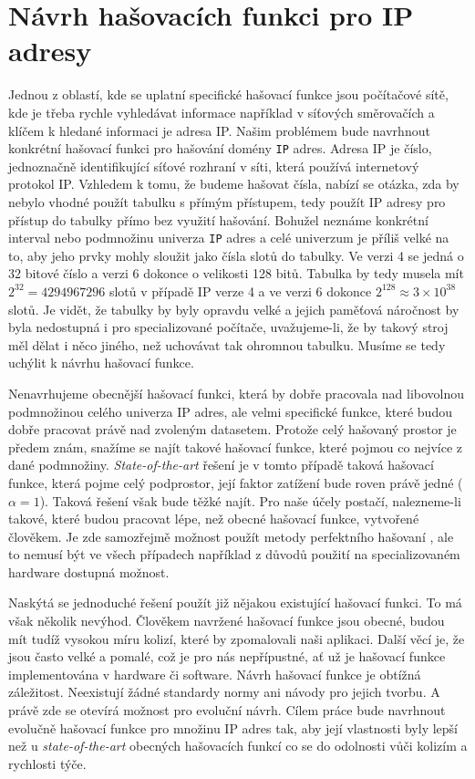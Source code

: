 \section{Návrh hašovacích funkci pro IP adresy}
Jednou z oblastí, kde se uplatní specifické hašovací funkce jsou počítačové sítě,
kde je třeba rychle vyhledávat informace například v síťových směrovačích a
klíčem k hledané informaci je adresa IP.
Našim problémem bude navrhnout konkrétní hašovací funkci pro hašování domény
\texttt{IP} adres. Adresa IP je číslo, jednoznačně identifikující síťové
rozhraní v síti, která používá internetový protokol IP. Vzhledem k tomu,
že budeme hašovat čísla, nabízí se otázka, zda by nebylo vhodné použít tabulku
s přímým přístupem, tedy použít IP adresy pro přístup do tabulky
přímo bez využití hašování. Bohužel neznáme konkrétní interval nebo podmnožinu
univerza \texttt{IP} adres a celé univerzum je příliš velké na to, aby jeho 
prvky mohly sloužit jako čísla slotů do tabulky. Ve verzi 4 se jedná o 32 
bitové číslo a verzi 6 dokonce o velikosti 128 bitů. Tabulka by tedy musela
mít $2^{32} = 4 294 967 296$ slotů v případě IP verze 4 a ve verzi 6
dokonce $2^{128} \approx 3 \times 10^{38}$
slotů. Je vidět, že tabulky by byly opravdu velké a jejich paměťová náročnost
by byla nedostupná i pro specializované počítače, uvažujeme-li, že by takový
stroj měl dělat i něco jiného, než uchovávat tak ohromnou tabulku. Musíme se
tedy uchýlit k návrhu hašovací funkce.

Nenavrhujeme obecnější hašovací funkci, která by dobře
pracovala nad libovolnou podmnožinou celého univerza IP adres, ale velmi
specifické funkce, které budou dobře pracovat právě nad zvoleným datasetem.
Protože celý hašovaný prostor je předem znám, snažíme se najít takové hašovací
funkce, které pojmou co nejvíce z dané podmnožiny. \textit{State-of-the-art} řešení je v
tomto případě taková hašovací funkce, která pojme celý podprostor, její 
faktor zatížení bude roven právě jedné ($\alpha = 1$). Taková řešení však
bude těžké najít. Pro naše účely postačí, nalezneme-li takové, které budou
pracovat lépe, než obecné hašovací funkce, vytvořené člověkem. Je zde samozřejmě
možnost použít metody perfektního hašovaní \cite{perfect_hashing}, ale to nemusí
být ve všech případech například z důvodů použití na specializovaném hardware
dostupná možnost.

Naskýtá se jednoduché řešení použít již nějakou existující hašovací funkci. To má však
několik nevýhod. Člověkem navržené hašovací funkce jsou obecné, budou mít tudíž vysokou
míru kolizí, které by zpomalovali naši aplikaci. Další věcí je, že jsou často velké
a pomalé, což je pro nás nepřípustné, ať už je hašovací funkce implementována v hardware
či software. Návrh hašovací funkce je obtížná záležitost. Neexistují žádné standardy normy ani 
návody pro jejich tvorbu. A právě zde se otevírá možnost pro evoluční návrh. Cílem práce
bude navrhnout evolučně hašovací funkce pro množinu IP adres tak, aby její vlastnosti
byly lepší než u \textit{state-of-the-art} obecných hašovacích funkcí co se do
odolnosti vůči kolizím a rychlosti týče.

